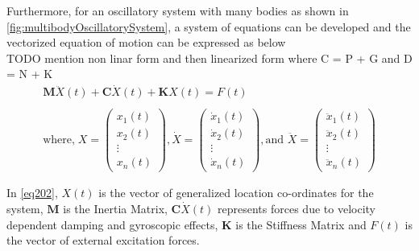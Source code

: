 Furthermore, for an oscillatory system with many bodies as shown in \cref{fig:multibodyOscillatorySystem}, a system of equations can be developed and the vectorized equation of motion can be expressed as below
\\ TODO mention non linar form and then linearized form where C = P + G and D = N + K
\begin{equation}
\begin{gathered}
\mathbf{M} \mathit{\ddot{X}}(t) + \mathbf{C} \mathit{\dot{X}}(t) + \mathbf{K} \mathit{X}(t) = \mathit{F}(t) \\
\\
\text{where,}\; 
\mathit{X} = \begin{pmatrix}
           x_{1}(t) \\
           x_{2}(t) \\
           \vdots \\
           x_{n}(t)
         \end{pmatrix}
, 
\mathit{\dot{X}} = \begin{pmatrix}
           \dot{x}_{1}(t) \\
           \dot{x}_{2}(t) \\
           \vdots \\
           \dot{x}_{n}(t)
         \end{pmatrix}
,
\text{and }
\mathit{\ddot{X}} = \begin{pmatrix}
           \ddot{x}_{1}(t) \\
           \ddot{x}_{2}(t) \\
           \vdots \\
           \ddot{x}_{n}(t)
         \end{pmatrix}
\end{gathered}
\label{eq202}
\end{equation}

In \cref{eq202}, $\mathit{X}(t)$ is the vector of generalized location co-ordinates for the system, $\mathbf{M}$ is the Inertia Matrix, $\mathbf{C} \mathit{\dot{X}}(t)$ represents forces due to velocity dependent damping and gyroscopic effects, $\mathbf{K}$ is the Stiffness Matrix and $\mathit{F}(t)$ is the vector of external excitation forces.

